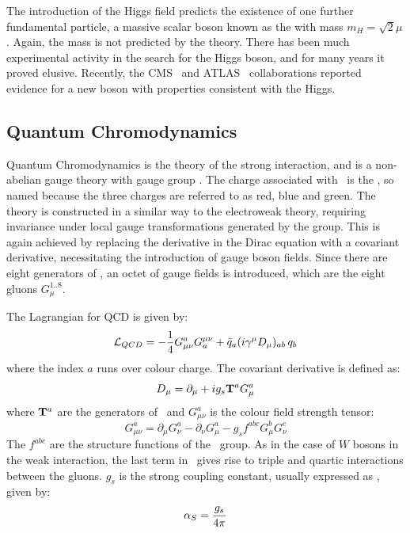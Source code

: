 The introduction of the Higgs field predicts the existence of one further
fundamental particle, a massive scalar boson known as the 
with mass $m_{H} = \sqrt{2}\mu$. Again, the mass is not predicted by the theory. 
There has
been much experimental activity in the search for the Higgs boson, and for many
years it proved elusive. Recently,
the CMS~\cite{CMS_Higgs:2012gu} and ATLAS~\cite{ATLAS_Higgs:2012gk} collaborations reported evidence for a new boson with
properties consistent with the Higgs.

\subsection{Quantum Chromodynamics}
\label{sec:qcd}

Quantum Chromodynamics is the theory of the strong interaction, and is a
non-abelian gauge theory with gauge group \suthree. The charge associated with
\suthree\ is the , so named because the three 
charges are referred to as red, blue and green. The theory is constructed
in a similar way to the electroweak theory, requiring invariance under
local gauge transformations generated by the group. This is again achieved by
replacing the derivative in the Dirac equation
with a covariant derivative, necessitating the introduction of gauge boson fields.
Since there are eight generators of \suthree, an octet of gauge fields is
introduced, which are the eight gluons $G_{\mu}^{1..8}$. 

The Lagrangian for QCD is
given by:
\begin{equation}
\mathcal{L}_{QCD} = -\frac{1}{4}G^{a}_{\mu\nu}G_{a}^{\mu\nu} +
\bar{q}_{a}(i\gamma^{\mu} D_{\mu})_{ab}\, q_{b}
\end{equation}
where the index $a$ runs over colour charge. The covariant derivative is defined
as:
\begin{equation}
D_{\mu}  =  \partial_{\mu} + ig_{s}{\bf T}^{a} G^{a}_{\mu}
\end{equation}
where ${\bf T}^{a}$ are the generators of \suthree\ and $G^{a}_{\mu\nu}$ is the colour field strength tensor:
\begin{equation}
 G^{a}_{\mu\nu} =
\partial_{\mu} G^{a}_{\nu} - \partial_{\nu} G^{a}_{\mu} - g_{s} f^{abc} G^{b}_{\mu}
G^{c}_{\nu}
\label{eqn:colour-field-strength}
\end{equation}
The $f^{abc}$ are the structure functions of the \suthree\ group. As in the case
of $W$ bosons in the weak interaction, the last term in~ gives rise to triple and quartic interactions
between the gluons. $g_{s}$ is the strong coupling constant, usually expressed
as \alphaS, given by:
\begin{equation}
\alphaS = \frac{g_{s}}{4\pi}
\end{equation}


